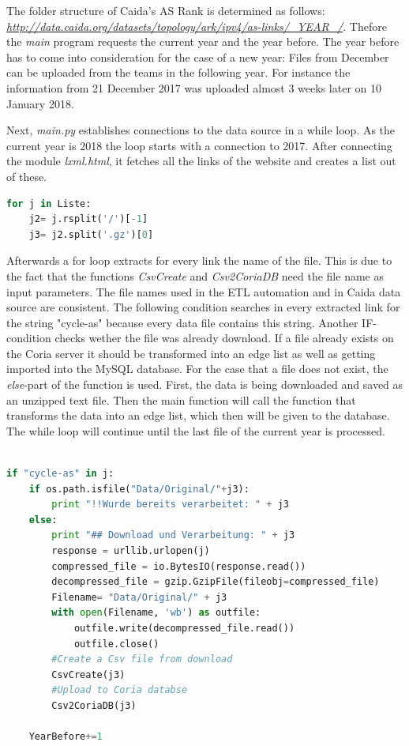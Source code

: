 \documentclass[conference, 11pt]{IEEEtran}
\begin{document}
The folder structure of Caida's AS Rank is determined as follows: \textit{\url{http://data.caida.org/datasets/topology/ark/ipv4/as-links/_YEAR_/}}. Thefore the \textit{main} program requests the current year and the year before. The year before has to come into consideration for the case of a new year: Files from December can be uploaded from the teams in the following year. For instance the information from 21 December 2017 was uploaded almost 3 weeks later on 10 January 2018.

Next, \textit{main.py} establishes connections to the data source in a while loop. As the current year is 2018 the loop starts with a connection to 2017. After connecting the module \textit{lxml.html}, it fetches all the links of the website and creates a list out of these.

\vspace{0.5cm}
\begin{lstlisting}[language=Python, caption={...},captionpos=b, xleftmargin=.02\textwidth, linewidth = 0.95\columnwidth]
for j in Liste:
	j2= j.rsplit('/')[-1]
	j3= j2.split('.gz')[0]

\end{lstlisting}
\vspace{0.5cm}


Afterwards a for loop extracts for every link the name of the file. This is due to the fact that the functions \textit{CsvCreate} and \textit{Csv2CoriaDB} need the file name as input parameters. The file names used in the ETL automation and in Caida data source are consistent. The following condition searches in every extracted link for the string "cycle-as" because every data file contains this string. Another IF-condition checks wether the file was already download. If a file already exists on the Coria server it should be transformed into an edge list as well as getting imported into the MySQL database. For the case that a file does not exist, the \textit{else}-part of the function is used. First, the data is being downloaded and saved as an unzipped text file. 
Then the main function will call the function that transforms the data into an edge list, which then will be given to the database. The while loop will continue until the last file of the current year is processed.
\linebreak


\begin{lstlisting}[float=*, language=Python,caption={A wide listing float, single column},captionpos=b , xleftmargin=.02\textwidth, linewidth = 0.95\textwidth] 

if "cycle-as" in j:
	if os.path.isfile("Data/Original/"+j3):
		print "!!Wurde bereits verarbeitet: " + j3
	else:
		print "## Download und Verarbeitung: " + j3
		response = urllib.urlopen(j)
		compressed_file = io.BytesIO(response.read())
		decompressed_file = gzip.GzipFile(fileobj=compressed_file)
		Filename= "Data/Original/" + j3
		with open(Filename, 'wb') as outfile:
			outfile.write(decompressed_file.read())
			outfile.close()
		#Create a Csv file from download 
		CsvCreate(j3)
		#Upload to Coria databse 
		Csv2CoriaDB(j3)

	YearBefore+=1 

\end{lstlisting}
\end{document}
